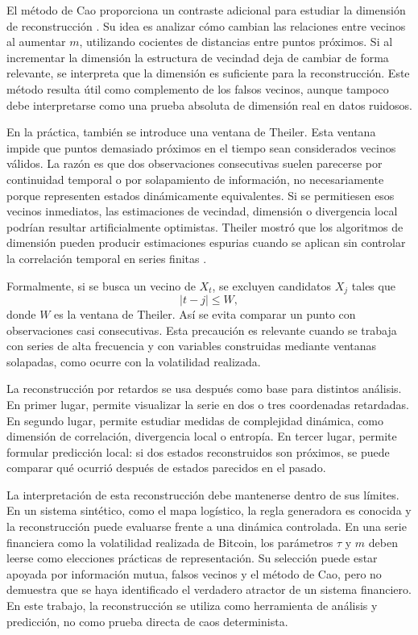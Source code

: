 El método de Cao proporciona un contraste adicional para estudiar la dimensión de reconstrucción \cite{cao1997}. Su idea es analizar cómo cambian las relaciones entre vecinos al aumentar \(m\), utilizando cocientes de distancias entre puntos próximos. Si al incrementar la dimensión la estructura de vecindad deja de cambiar de forma relevante, se interpreta que la dimensión es suficiente para la reconstrucción. Este método resulta útil como complemento de los falsos vecinos, aunque tampoco debe interpretarse como una prueba absoluta de dimensión real en datos ruidosos.

En la práctica, también se introduce una ventana de Theiler. Esta ventana impide que puntos demasiado próximos en el tiempo sean considerados vecinos válidos. La razón es que dos observaciones consecutivas suelen parecerse por continuidad temporal o por solapamiento de información, no necesariamente porque representen estados dinámicamente equivalentes. Si se permitiesen esos vecinos inmediatos, las estimaciones de vecindad, dimensión o divergencia local podrían resultar artificialmente optimistas. Theiler mostró que los algoritmos de dimensión pueden producir estimaciones espurias cuando se aplican sin controlar la correlación temporal en series finitas \cite{theiler1986}.

Formalmente, si se busca un vecino de \(X_t\), se excluyen candidatos \(X_j\) tales que
\begin{equation}
    |t-j| \leq W,
\end{equation}
donde \(W\) es la ventana de Theiler. Así se evita comparar un punto con observaciones casi consecutivas. Esta precaución es relevante cuando se trabaja con series de alta frecuencia y con variables construidas mediante ventanas solapadas, como ocurre con la volatilidad realizada.

La reconstrucción por retardos se usa después como base para distintos análisis. En primer lugar, permite visualizar la serie en dos o tres coordenadas retardadas. En segundo lugar, permite estudiar medidas de complejidad dinámica, como dimensión de correlación, divergencia local o entropía. En tercer lugar, permite formular predicción local: si dos estados reconstruidos son próximos, se puede comparar qué ocurrió después de estados parecidos en el pasado.

La interpretación de esta reconstrucción debe mantenerse dentro de sus límites. En un sistema sintético, como el mapa logístico, la regla generadora es conocida y la reconstrucción puede evaluarse frente a una dinámica controlada. En una serie financiera como la volatilidad realizada de Bitcoin, los parámetros \(\tau\) y \(m\) deben leerse como elecciones prácticas de representación. Su selección puede estar apoyada por información mutua, falsos vecinos y el método de Cao, pero no demuestra que se haya identificado el verdadero atractor de un sistema financiero. En este trabajo, la reconstrucción se utiliza como herramienta de análisis y predicción, no como prueba directa de caos determinista.

